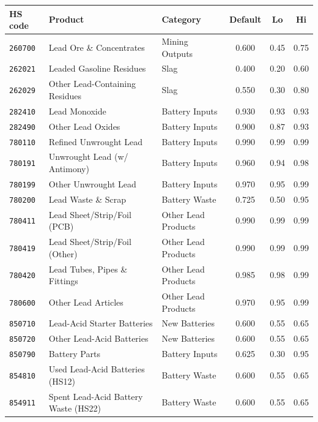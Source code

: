 \documentclass[11pt,a4paper]{article}
\newcommand{\hs}[1]{\texttt{#1}}
\begin{document}
\begin{longtable}{l L{4.6cm} L{2.9cm} c c c}
\toprule
\textbf{HS code} & \textbf{Product} & \textbf{Category} & \textbf{Default} &
\textbf{Lo} & \textbf{Hi} \\
\midrule
\endhead
\hs{260700} & Lead Ore \& Concentrates      & Mining Outputs      & 0.600 & 0.45 & 0.75 \\
\hs{262021} & Leaded Gasoline Residues       & Slag                & 0.400 & 0.20 & 0.60 \\
\hs{262029} & Other Lead-Containing Residues & Slag                & 0.550 & 0.30 & 0.80 \\
\hs{282410} & Lead Monoxide                  & Battery Inputs      & 0.930 & 0.93 & 0.93 \\
\hs{282490} & Other Lead Oxides              & Battery Inputs      & 0.900 & 0.87 & 0.93 \\
\hs{780110} & Refined Unwrought Lead         & Battery Inputs      & 0.990 & 0.99 & 0.99 \\
\hs{780191} & Unwrought Lead (w/ Antimony)   & Battery Inputs      & 0.960 & 0.94 & 0.98 \\
\hs{780199} & Other Unwrought Lead           & Battery Inputs      & 0.970 & 0.95 & 0.99 \\
\hs{780200} & Lead Waste \& Scrap            & Battery Waste       & 0.725 & 0.50 & 0.95 \\
\hs{780411} & Lead Sheet/Strip/Foil (PCB)    & Other Lead Products & 0.990 & 0.99 & 0.99 \\
\hs{780419} & Lead Sheet/Strip/Foil (Other)  & Other Lead Products & 0.990 & 0.99 & 0.99 \\
\hs{780420} & Lead Tubes, Pipes \& Fittings  & Other Lead Products & 0.985 & 0.98 & 0.99 \\
\hs{780600} & Other Lead Articles            & Other Lead Products & 0.970 & 0.95 & 0.99 \\
\hs{850710} & Lead-Acid Starter Batteries    & New Batteries       & 0.600 & 0.55 & 0.65 \\
\hs{850720} & Other Lead-Acid Batteries      & New Batteries       & 0.600 & 0.55 & 0.65 \\
\hs{850790} & Battery Parts                  & Battery Inputs      & 0.625 & 0.30 & 0.95 \\
\hs{854810} & Used Lead-Acid Batteries (HS12)& Battery Waste       & 0.600 & 0.55 & 0.65 \\
\hs{854911} & Spent Lead-Acid Battery Waste (HS22) & Battery Waste & 0.600 & 0.55 & 0.65 \\
\bottomrule
\end{longtable}
\end{document}
